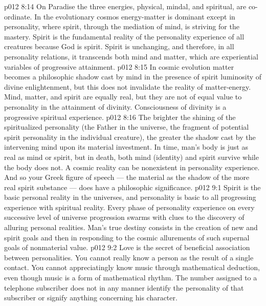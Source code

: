 \vs p012 8:14 \pc On Paradise the three energies, physical, mindal, and spiritual, are co\hyp{}ordinate. In the evolutionary cosmos energy\hyp{}matter is dominant except in personality, where spirit, through the mediation of mind, is striving for the mastery. Spirit is the fundamental reality of the personality experience of all creatures because God is spirit. Spirit is unchanging, and therefore, in all personality relations, it transcends both mind and matter, which are experiential variables of progressive attainment.
\vs p012 8:15 In cosmic evolution matter becomes a philosophic shadow cast by mind in the presence of spirit luminosity of divine enlightenment, but this does not invalidate the reality of matter\hyp{}energy. Mind, matter, and spirit are equally real, but they are not of equal value to personality in the attainment of divinity. Consciousness of divinity is a progressive spiritual experience.
\vs p012 8:16 The brighter the shining of the spiritualized personality (the Father in the universe, the fragment of potential spirit personality in the individual creature), the greater the shadow cast by the intervening mind upon its material investment. In time, man’s body is just as real as mind or spirit, but in death, both mind (identity) and spirit survive while the body does not. A cosmic reality can be nonexistent in personality experience. And so your Greek figure of speech --- the material as the shadow of the more real spirit substance --- does have a philosophic significance.
\vs p012 9:1 Spirit is the basic personal reality in the universes, and personality is basic to all progressing experience with spiritual reality. Every phase of personality experience on every successive level of universe progression swarms with clues to the discovery of alluring personal realities. Man’s true destiny consists in the creation of new and spirit goals and then in responding to the cosmic allurements of such supernal goals of nonmaterial value.
\vs p012 9:2 \pc Love is the secret of beneficial association between personalities. You cannot really know a person as the result of a single contact. You cannot appreciatingly know music through mathematical deduction, even though music is a form of mathematical rhythm. The number assigned to a telephone subscriber does not in any manner identify the personality of that subscriber or signify anything concerning his character.
